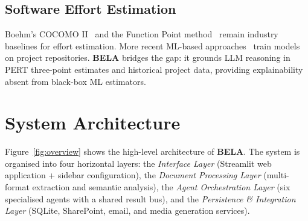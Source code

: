 \documentclass[10pt,twocolumn]{article}
\newcommand{\bela}{\textbf{BELA}}
\begin{document}
\subsection{Software Effort Estimation}

Boehm's COCOMO II~\cite{boehm2000software} and the Function Point
method~\cite{ifpug2010} remain industry baselines for effort estimation.
More recent ML-based approaches~\cite{papa2020effort} train models on
project repositories. \bela{} bridges the gap: it grounds LLM reasoning in
PERT three-point estimates and historical project data, providing
explainability absent from black-box ML estimators.

\section{System Architecture}
\label{sec:architecture}

Figure~\ref{fig:overview} shows the high-level architecture of \bela{}.
The system is organised into four horizontal layers: the \textit{Interface Layer}
(Streamlit web application + sidebar configuration), the
\textit{Document Processing Layer} (multi-format extraction and semantic
analysis), the \textit{Agent Orchestration Layer} (six specialised agents
with a shared result bus), and the \textit{Persistence \& Integration Layer}
(SQLite, SharePoint, email, and media generation services).
\end{document}

